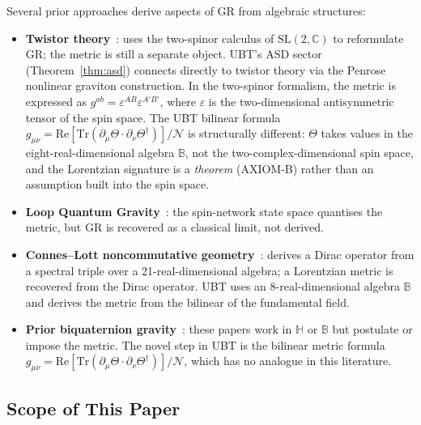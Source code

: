 \documentclass[12pt,a4paper]{article}
\theoremstyle{definition}
\theoremstyle{remark}
\newcommand{\BB}{\mathbb{B}}
\newcommand{\CC}{\mathbb{C}}
\newcommand{\HH}{\mathbb{H}}
\newcommand{\Tr}{\mathrm{Tr}}
\newcommand{\re}{\mathrm{Re}}
\newcommand{\calN}{\mathcal{N}}
\begin{document}
Several prior approaches derive aspects of GR from algebraic structures:

\begin{itemize}
  \item \textbf{Twistor theory}~\cite{penrose1976,penrose_rindler1984}:
        uses the two-spinor calculus of $\mathrm{SL}(2,\CC)$ to reformulate
        GR; the metric is still a separate object.
        UBT's ASD sector (Theorem~\ref{thm:asd}) connects directly to twistor
        theory via the Penrose nonlinear graviton construction.
        In the two-spinor formalism, the metric is expressed as
        $g^{ab} = \varepsilon^{AB}\varepsilon^{A'B'}$, where $\varepsilon$ is
        the two-dimensional antisymmetric tensor of the spin space.
        The UBT bilinear formula
        $g_{\mu\nu} = \re[\Tr(\partial_\mu\Theta \cdot \partial_\nu\Theta^\dagger)]/\calN$
        is structurally different: $\Theta$ takes values in the eight-real-dimensional
        algebra $\BB$, not the two-complex-dimensional spin space, and the Lorentzian
        signature is a \emph{theorem} (AXIOM-B) rather than an assumption built into
        the spin space.

  \item \textbf{Loop Quantum Gravity}~\cite{thiemann2007}:
        the spin-network state space quantises the metric, but GR is
        recovered as a classical limit, not derived.

  \item \textbf{Connes--Lott noncommutative geometry}~\cite{connes1991}:
        derives a Dirac operator from a spectral triple over a
        21-real-dimensional algebra; a Lorentzian metric is recovered
        from the Dirac operator.
        UBT uses an 8-real-dimensional algebra $\BB$ and derives the
        metric from the bilinear of the fundamental field.

  \item \textbf{Prior biquaternion gravity}~\cite{adler1995,finkelstein1962,deleo1996}:
        these papers work in $\HH$ or $\BB$ but postulate or impose the
        metric.
        The novel step in UBT is the bilinear metric formula
        $g_{\mu\nu} = \re[\Tr(\partial_\mu\Theta \cdot \partial_\nu\Theta^\dagger)]/\calN$,
        which has no analogue in this literature.
\end{itemize}

\subsection{Scope of This Paper}
\end{document}
